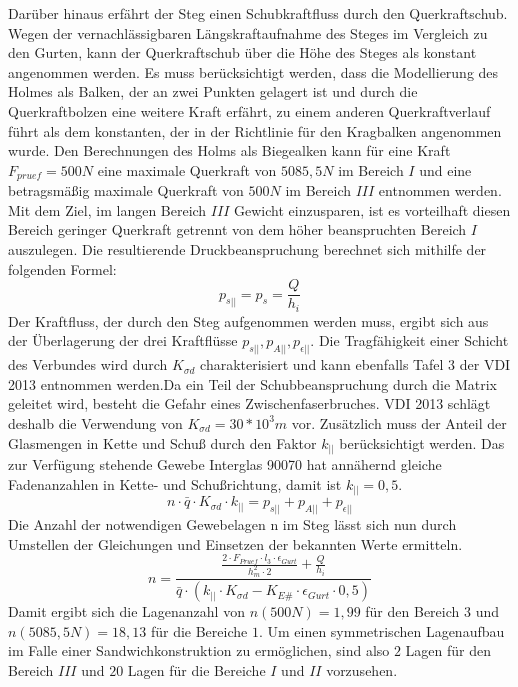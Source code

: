 \noindent Darüber hinaus erfährt der Steg einen Schubkraftfluss durch den Querkraftschub. Wegen der vernachlässigbaren Längskraftaufnahme des Steges im Vergleich zu den Gurten, kann der Querkraftschub über die Höhe des Steges als konstant angenommen werden. Es muss berücksichtigt werden, dass die Modellierung des Holmes als Balken, der an zwei Punkten gelagert ist und durch die Querkraftbolzen eine weitere Kraft erfährt, zu einem anderen Querkraftverlauf führt als dem konstanten, der in der Richtlinie für den Kragbalken angenommen wurde. Den Berechnungen des Holms als Biegealken kann für eine Kraft $ F_{pruef}=500N $ eine maximale Querkraft von $ 5085,5N $ im Bereich $ I $ und eine betragsmäßig maximale Querkraft von $ 500N $ im Bereich $ III $ entnommen werden. Mit dem Ziel, im langen Bereich $ III $ Gewicht einzusparen, ist es vorteilhaft diesen Bereich geringer Querkraft getrennt von dem höher beanspruchten Bereich $ I $ auszulegen. Die resultierende Druckbeanspruchung berechnet sich mithilfe der folgenden Formel:\\
\begin{equation}
	p_{s||}=p_{s}=\frac{Q}{h_{i}}
\end{equation}
Der Kraftfluss, der durch den Steg aufgenommen werden muss, ergibt sich aus der Überlagerung der drei Kraftflüsse $ p_{s||}, p_{A||}, p_{\epsilon||} $. Die Tragfähigkeit einer Schicht des Verbundes wird durch $ K_{\sigma d} $ charakterisiert und kann ebenfalls Tafel 3 der VDI 2013 entnommen werden.Da ein Teil der Schubbeanspruchung durch die Matrix geleitet wird, besteht die Gefahr eines Zwischenfaserbruches. VDI 2013 schlägt deshalb die Verwendung von $ K_{\sigma d}=30*10^{3}m $ vor.  Zusätzlich muss der Anteil der Glasmengen in Kette und Schuß durch den Faktor $ k_{||} $ berücksichtigt werden. Das zur Verfügung stehende Gewebe Interglas 90070 hat annähernd gleiche Fadenanzahlen in Kette- und Schußrichtung, damit ist $ k_{||}=0,5 $. 
\begin{equation}
	n\cdot \bar{q}\cdot K_{\sigma d}\cdot k_{||}=p_{s||}+p_{A||}+p_{\epsilon||}
\end{equation}
Die Anzahl der notwendigen Gewebelagen n im Steg lässt sich nun durch Umstellen der Gleichungen und Einsetzen der bekannten Werte ermitteln.\\
\begin{equation}
	n=\frac{\frac{2\cdot F_{Pruef}\cdot l_{3}\cdot \epsilon_{Gurt}}{h_{m}^{2}\cdot 2}+\frac{Q}{h_{i}}}{\bar{q}\cdot \left(k_{||}\cdot K_{\sigma d}-K_{E\#}\cdot \epsilon_{Gurt}\cdot 0,5\right)}
\end{equation}
Damit ergibt sich die Lagenanzahl von $ n\left(500N\right)=1,99 $ für den Bereich $ 3 $ und $ n\left(5085,5N\right)=18,13 $ für die Bereiche $ 1 $. Um einen symmetrischen Lagenaufbau im Falle einer Sandwichkonstruktion zu ermöglichen, sind also $ 2 $ Lagen für den Bereich $ III $ und $ 20 $ Lagen für die Bereiche $ I $ und $ II $ vorzusehen.\\

